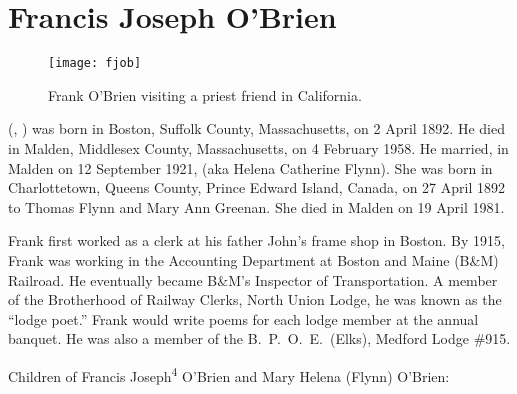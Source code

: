 \section{Francis Joseph O'Brien}\label{per:Francis4OBrien}

\begin{figure}[htbp]
	\centering
	\texttt{[image: fjob]}
	\caption{Frank O'Brien visiting a priest friend in California.}
	\label{fig:FJOB}
\end{figure}

 (, ) was born in Boston, Suffolk County, Massachusetts, on 2 April 1892.\cite{Francis4OBrienBirth} He died in Malden, Middlesex County, Massachusetts, on 4 February 1958.\cite{Francis4OBrienDeath} He married, in Malden on 12 September 1921,  (aka Helena Catherine Flynn).\cite{Francis4OBrienMarriageCert} She was born in Charlottetown, Queens County, Prince Edward Island, Canada, on 27 April 1892 to Thomas Flynn and Mary Ann Greenan.\cite{MaryFlynnBirth} She died in Malden on 19 April 1981.\cite{MaryFlynnDeath}

Frank first worked as a clerk at his father John's frame shop in Boston.\cite{Census1910Francis4OBrien} By 1915, Frank was working in the Accounting Department at Boston and Maine (B\&M) Railroad.\cite{Francis4OBrienAccounting} He eventually became B\&M's Inspector of Transportation.\cite{Francis4OBrienInspector} A member of the Brotherhood of Railway Clerks, North Union Lodge, he was known as the ``lodge poet.'' Frank would write poems for each lodge member at the annual banquet.\cite{Francis4OBrienPoet} He was also a member of the B.\ P.\ O.\ E.\ (Elks), Medford Lodge \#915.\cite{Francis4OBrienBPOE}

\begin{KidsIntro}
	Children of Francis Joseph\textsuperscript{4} O'Brien and Mary Helena (Flynn) O'Brien:
\end{KidsIntro}

